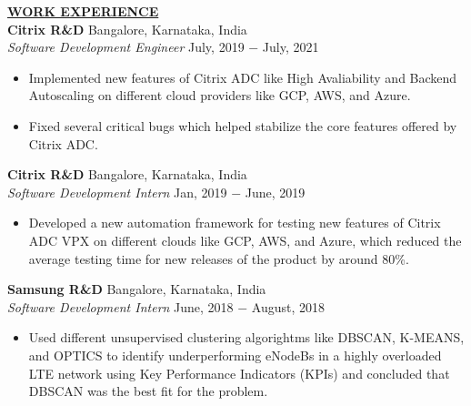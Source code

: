 \documentclass{article}
\begin{document}
% 
%
\noindent \textbf{\underline{WORK EXPERIENCE}} \\
\noindent \textbf{Citrix R\&D} \hfill Bangalore, Karnataka, India \\
\textit{Software Development Engineer} \hfill July, 2019 $-$ July, 2021
\begin{itemize}[noitemsep,nolistsep,leftmargin=*]
\item {Implemented new features of Citrix ADC like High Avaliability and Backend Autoscaling on different cloud providers like GCP, AWS, and Azure.}
\item {Fixed several critical bugs which helped stabilize the core features offered by Citrix ADC. \\}
\end{itemize}

\noindent \textbf{Citrix R\&D} \hfill Bangalore, Karnataka, India \\
\textit{Software Development Intern} \hfill Jan, 2019 $-$ June, 2019
\begin{itemize}[noitemsep,nolistsep,leftmargin=*]
\item {Developed a new automation framework for testing new features of Citrix ADC VPX on different clouds like GCP, AWS, and Azure, which reduced the average testing time for new releases of the product by around 80\%. \\}
\end{itemize}

\noindent \textbf{Samsung R\&D} \hfill Bangalore, Karnataka, India \\
\textit{Software Development Intern} \hfill June, 2018 $-$ August, 2018
\begin{itemize}[noitemsep,nolistsep,leftmargin=*]
\item {Used different unsupervised clustering algorightms like DBSCAN, K-MEANS, and OPTICS to identify underperforming eNodeBs in a highly overloaded LTE network using Key Performance Indicators (KPIs) and concluded that DBSCAN was the best fit for the problem. \\}
\end{itemize}
\end{document}
